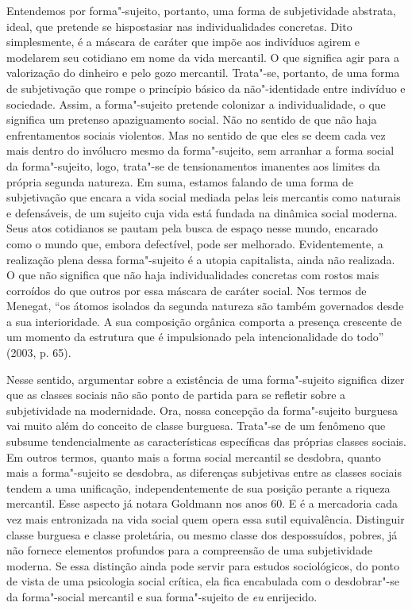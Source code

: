 Entendemos por forma"-sujeito, portanto, uma forma de subjetividade
abstrata, ideal, que pretende se hispostasiar nas individualidades
concretas. Dito simplesmente, é a máscara de caráter que impõe aos
indivíduos agirem e modelarem seu cotidiano em nome da vida mercantil. O
que significa agir para a valorização do dinheiro e pelo gozo mercantil.
Trata"-se, portanto, de uma forma de subjetivação que rompe o princípio
básico da não"-identidade entre indivíduo e sociedade. Assim, a
forma"-sujeito pretende colonizar a individualidade, o que significa um
pretenso apaziguamento social. Não no sentido de que não haja
enfrentamentos sociais violentos. Mas no sentido de que eles se deem
cada vez mais dentro do invólucro mesmo da forma"-sujeito, sem arranhar a
forma social da forma"-sujeito, logo, trata"-se de tensionamentos
imanentes aos limites da própria segunda natureza. Em suma, estamos
falando de uma forma de subjetivação que encara a vida social mediada
pelas leis mercantis como naturais e defensáveis, de um sujeito cuja
vida está fundada na dinâmica social moderna. Seus atos cotidianos se
pautam pela busca de espaço nesse mundo, encarado como o mundo que,
embora defectível, pode ser melhorado. Evidentemente, a realização plena
dessa forma"-sujeito é a utopia capitalista, ainda não realizada. O que
não significa que não haja individualidades concretas com rostos mais
corroídos do que outros por essa máscara de caráter social. Nos termos
de Menegat, ``os átomos isolados da segunda natureza são também
governados desde a sua interioridade. A sua composição orgânica comporta
a presença crescente de um momento da estrutura que é impulsionado pela
intencionalidade do todo'' (2003, p. 65).

Nesse sentido, argumentar sobre a existência de uma forma"-sujeito
significa dizer que as classes sociais não são ponto de partida para
se refletir sobre a subjetividade na modernidade. Ora, nossa concepção
da forma"-sujeito burguesa vai muito além do conceito de classe burguesa.
Trata"-se de um fenômeno que subsume tendencialmente as características
específicas das próprias classes sociais. Em outros termos, quanto mais
a forma social mercantil se desdobra, quanto mais a forma"-sujeito se
desdobra, as diferenças subjetivas entre as classes sociais tendem a uma
unificação, independentemente de sua posição perante a riqueza
mercantil. Esse aspecto já notara Goldmann nos anos 60. E é a mercadoria
cada vez mais entronizada na vida social quem opera essa sutil
equivalência. Distinguir classe burguesa e classe proletária, ou mesmo
classe dos despossuídos, pobres, já não fornece elementos profundos para
a compreensão de uma subjetividade moderna. Se essa distinção ainda pode
servir para estudos sociológicos, do ponto de vista de uma psicologia
social crítica, ela fica encabulada com o desdobrar"-se da forma"-social
mercantil e sua forma"-sujeito de \emph{eu} enrijecido.

